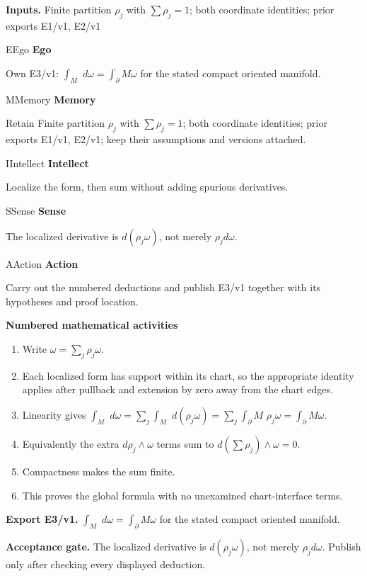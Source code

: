 \documentclass[preprint,12pt,aps,pra,showkeys,amsmath,amssymb,superscriptaddress,floatfix]{revtex4-2}
\theoremstyle{definition}
\theoremstyle{remark}
\newcommand{\mmfaculty}[3]{%
 \begin{mmfacultybox}{#1}{#2}
 {\sffamily\bfseries\color{MMBlue}#2}\par\smallskip #3
 \end{mmfacultybox}}
\newcommand{\field}[2]{\par\smallskip\noindent\textbf{#1.} #2\par}
\begin{document}
\field{Inputs}{Finite partition \(\rho _j\) with \(\sum \rho _j=1\); both coordinate
identities; prior exports E1/v1, E2/v1}

\mmfaculty{E}{Ego}{Own E3/v1: \(\int _M\) \(d\omega =\int _\partial M\omega\) for the
stated compact oriented manifold.}

\mmfaculty{M}{Memory}{Retain Finite partition \(\rho _j\) with \(\sum \rho _j=1\); both
coordinate identities; prior exports E1/v1, E2/v1; keep their
assumptions and versions attached.}

\mmfaculty{I}{Intellect}{Localize the form, then sum without adding spurious derivatives.}

\mmfaculty{S}{Sense}{The localized derivative is \(d(\rho _j\omega )\), not merely
\(\rho _jd\omega\).}

\mmfaculty{A}{Action}{Carry out the numbered deductions and publish E3/v1 together with its
hypotheses and proof location.}

\smallskip\noindent\textbf{Numbered mathematical activities}

\begin{enumerate}[label=N3.\arabic*,leftmargin=3.4em]

\item Write \(\omega =\sum _j\rho _j\omega\).

\item Each localized form has support within its chart, so the appropriate
identity applies after pullback and extension by zero away from the
chart edges.

\item Linearity gives \(\int _M\) \(d\omega =\sum _j\int _M\)
\(d(\rho _j\omega )=\sum _j\int _\partial M\)
\(\rho _j\omega =\int _\partial M\omega\).

\item Equivalently the extra \(d\rho _j\wedge \omega\) terms sum to
\(d(\sum \rho _j)\wedge \omega =0\).

\item Compactness makes the sum finite.

\item This proves the global formula with no unexamined chart-interface terms.

\end{enumerate}

\field{Export E3/v1}{\(\int _M\) \(d\omega =\int _\partial M\omega\) for the stated compact
oriented manifold.}

\field{Acceptance gate}{The localized derivative is \(d(\rho _j\omega )\), not merely
\(\rho _jd\omega\). Publish only after checking every displayed
deduction.}
\end{document}
